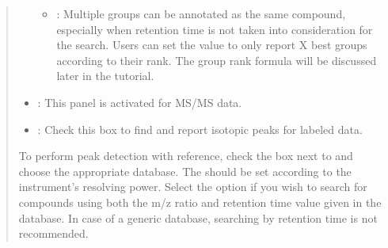 \documentclass[letterpaper,10pt,english,openany,oneside]{sphinxmanual}
\begin{document}
\begin{quote}
\begin{itemize}
\begin{itemize}
\item {} 
: Multiple groups can be annotated as the same compound, especially when retention time is not taken into consideration for the search. Users can set the value to only report X best groups according to their rank. The group rank formula will be discussed later in the tutorial.

\end{itemize}

\item {} 
: This panel is activated for MS/MS data.

\item {} 
: Check this box to find and report isotopic peaks for labeled data.

\end{itemize}

To perform peak detection with reference, check the box next to  and choose the appropriate database. The  should be set according to the instrument’s resolving power. Select the  option if you wish to search for compounds using both the m/z ratio and retention time value given in the database. In case of a generic database, searching by retention time is not recommended.
\end{quote}


\end{document}
